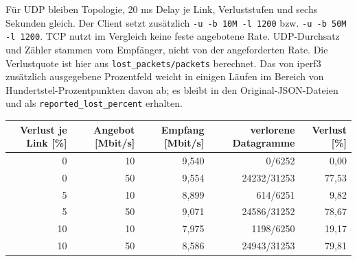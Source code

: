 \documentclass[a4paper,11pt]{article}
\begin{document}
Für UDP bleiben Topologie, 20 ms Delay je Link, Verluststufen und sechs Sekunden
gleich. Der Client setzt zusätzlich \texttt{-u -b 10M -l 1200} bzw.
\texttt{-u -b 50M -l 1200}. TCP nutzt im Vergleich keine feste angebotene Rate.
UDP-Durchsatz und Zähler stammen vom Empfänger, nicht von der angeforderten Rate.
Die Verlustquote ist hier aus \texttt{lost\_packets/packets} berechnet.
Das von iperf3 zusätzlich ausgegebene Prozentfeld weicht in einigen Läufen
im Bereich von Hundertstel-Prozentpunkten davon ab; es bleibt in den
Original-JSON-Dateien und als \texttt{reported\_lost\_percent} erhalten.
\begin{center}\small\begin{tabular}{rrrrr}\toprule
Verlust je Link [\%] & Angebot [Mbit/s] & Empfang [Mbit/s] & verlorene Datagramme & Verlust [\%]\\\midrule
0 & 10 & 9,540 & 0/6252 & 0,00\\
0 & 50 & 9,554 & 24232/31253 & 77,53\\
5 & 10 & 8,899 & 614/6251 & 9,82\\
5 & 50 & 9,071 & 24586/31252 & 78,67\\
10 & 10 & 7,975 & 1198/6250 & 19,17\\
10 & 50 & 8,586 & 24943/31253 & 79,81\\
\bottomrule\end{tabular}\end{center}
\begin{center}
\end{center}
\end{document}
